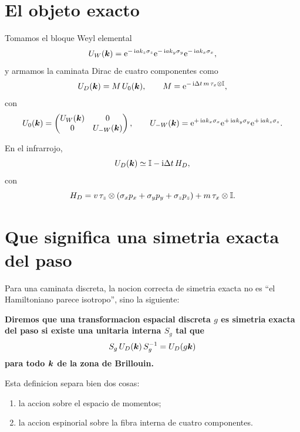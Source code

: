 \section{El objeto exacto}
Tomamos el bloque Weyl elemental
\begin{equation}
U_W(\bm{k})=
\mathrm{e}^{-\,\mathrm{i} a k_z \sigma_z}
\mathrm{e}^{-\,\mathrm{i} a k_y \sigma_y}
\mathrm{e}^{-\,\mathrm{i} a k_x \sigma_x},
\label{c25:eq:UW}
\end{equation}
y armamos la caminata Dirac de cuatro componentes como
\begin{equation}
U_D(\bm{k})=M\,U_0(\bm{k}),
\qquad
M=\mathrm{e}^{-\,\mathrm{i} \Delta t\,m\,\tau_x\otimes \mathbb{I}},
\label{c25:eq:UD}
\end{equation}
con
\begin{equation}
U_0(\bm{k})=
\begin{pmatrix}
U_W(\bm{k}) & 0\\
0 & U_{-W}(\bm{k})
\end{pmatrix},
\qquad
U_{-W}(\bm{k})=
\mathrm{e}^{+\,\mathrm{i} a k_x \sigma_x}
\mathrm{e}^{+\,\mathrm{i} a k_y \sigma_y}
\mathrm{e}^{+\,\mathrm{i} a k_z \sigma_z}.
\label{c25:eq:U0}
\end{equation}

En el infrarrojo,
\begin{equation}
U_D(\bm{k})\simeq \mathbb{I}-\mathrm{i}\Delta t\,H_D,
\end{equation}
con
\begin{equation}
H_D=
v\,\tau_z\otimes(\sigma_x p_x+\sigma_y p_y+\sigma_z p_z)
+m\,\tau_x\otimes\mathbb{I}.
\label{c25:eq:HD}
\end{equation}

\section{Que significa una simetria exacta del paso}
Para una caminata discreta, la nocion correcta de simetria exacta no es \enquote{el Hamiltoniano parece isotropo}, sino la siguiente:

\begin{displayquote}
\textbf{Diremos que una transformacion espacial discreta \(g\) es simetria exacta del paso si existe una unitaria interna \(S_g\) tal que}
\[
S_g\,U_D(\bm{k})\,S_g^{-1}=U_D(g\bm{k})
\]
\textbf{para todo \(\bm{k}\) de la zona de Brillouin.}
\end{displayquote}

Esta definicion separa bien dos cosas:
\begin{enumerate}[label=\arabic*.]
    \item la accion sobre el espacio de momentos;
    \item la accion espinorial sobre la fibra interna de cuatro componentes.
\end{enumerate}

